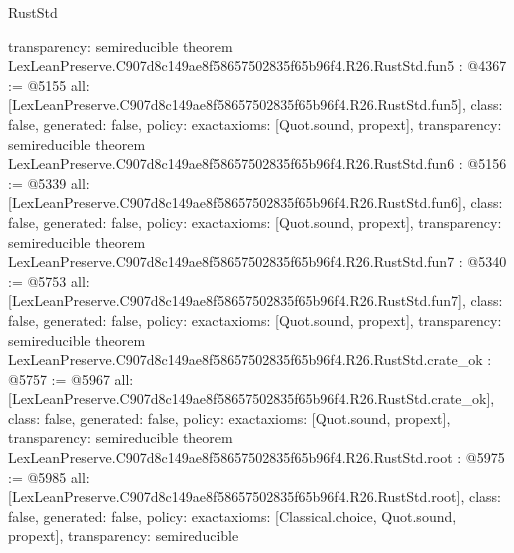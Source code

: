 \begin{lexlean}{RustStd}
\begin{coremodule}
{  transparency: semireducible
}
theorem LexLeanPreserve.C907d8c149ae8f58657502835f65b96f4.R26.RustStd.fun5 : @4367 := @5155 {
  all: [LexLeanPreserve.C907d8c149ae8f58657502835f65b96f4.R26.RustStd.fun5],
  class: false,
  generated: false,
  policy: exact{axioms: [Quot.sound, propext]},
  transparency: semireducible
}
theorem LexLeanPreserve.C907d8c149ae8f58657502835f65b96f4.R26.RustStd.fun6 : @5156 := @5339 {
  all: [LexLeanPreserve.C907d8c149ae8f58657502835f65b96f4.R26.RustStd.fun6],
  class: false,
  generated: false,
  policy: exact{axioms: [Quot.sound, propext]},
  transparency: semireducible
}
theorem LexLeanPreserve.C907d8c149ae8f58657502835f65b96f4.R26.RustStd.fun7 : @5340 := @5753 {
  all: [LexLeanPreserve.C907d8c149ae8f58657502835f65b96f4.R26.RustStd.fun7],
  class: false,
  generated: false,
  policy: exact{axioms: [Quot.sound, propext]},
  transparency: semireducible
}
theorem LexLeanPreserve.C907d8c149ae8f58657502835f65b96f4.R26.RustStd.crate_ok : @5757 := @5967 {
  all: [LexLeanPreserve.C907d8c149ae8f58657502835f65b96f4.R26.RustStd.crate_ok],
  class: false,
  generated: false,
  policy: exact{axioms: [Quot.sound, propext]},
  transparency: semireducible
}
theorem LexLeanPreserve.C907d8c149ae8f58657502835f65b96f4.R26.RustStd.root : @5975 := @5985 {
  all: [LexLeanPreserve.C907d8c149ae8f58657502835f65b96f4.R26.RustStd.root],
  class: false,
  generated: false,
  policy: exact{axioms: [Classical.choice, Quot.sound, propext]},
  transparency: semireducible
}


\end{coremodule}
\end{lexlean}
